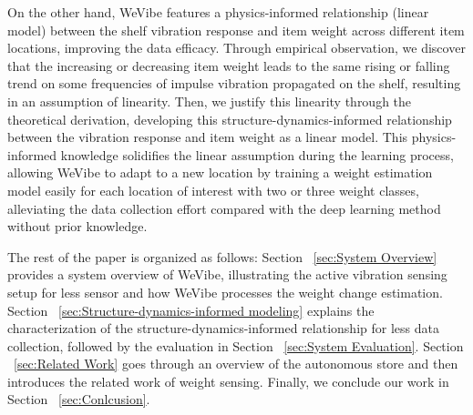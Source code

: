 On the other hand, WeVibe features a physics-informed relationship (linear model) between the shelf vibration response and item weight across different item locations, improving the data efficacy. Through empirical observation, we discover that the increasing or decreasing item weight leads to the same rising or falling trend on some frequencies of impulse vibration propagated on the shelf, resulting in an assumption of linearity. Then, we justify this linearity through the theoretical derivation, developing this structure-dynamics-informed relationship between the vibration response and item weight as a linear model. This physics-informed knowledge solidifies the linear assumption during the learning process, allowing WeVibe to adapt to a new location by training a weight estimation model easily for each location of interest with two or three weight classes, alleviating the data collection effort compared with the deep learning method without prior knowledge.

The rest of the paper is organized as follows: Section ~\ref{sec:System Overview} provides a system overview of WeVibe, illustrating the active vibration sensing setup for less sensor and how WeVibe processes the weight change estimation. Section ~\ref{sec:Structure-dynamics-informed modeling} explains the characterization of the structure-dynamics-informed relationship for less data collection, followed by the evaluation in Section ~\ref{sec:System Evaluation}. Section ~\ref{sec:Related Work} goes through an overview of the autonomous store and then introduces the related work of weight sensing. Finally, we conclude our work in Section ~\ref{sec:Conlcusion}.


